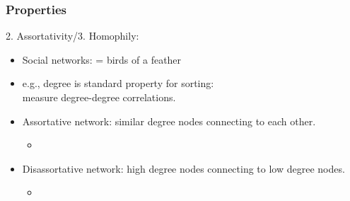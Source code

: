 

\begin{frame}
  \frametitle{Properties}

  \begin{block}{2. Assortativity/3. Homophily:}
    \begin{itemize}
    \item<1-> Social networks:  = birds of a feather
    \item<2-> e.g., degree is standard property for sorting:\\
      measure degree-degree correlations.
    \item<3->
      \alert{Assortative} network:\cite{newman2002a} 
      similar degree nodes connecting to each other.\\
      \begin{itemize}
      \item<5->
      \end{itemize}
    \item<4->
      \alert{Disassortative} network: high degree nodes connecting to low degree nodes.\\
      \begin{itemize}
      \item<6-> 
      \end{itemize}
    \end{itemize}
  \end{block}

\end{frame}

